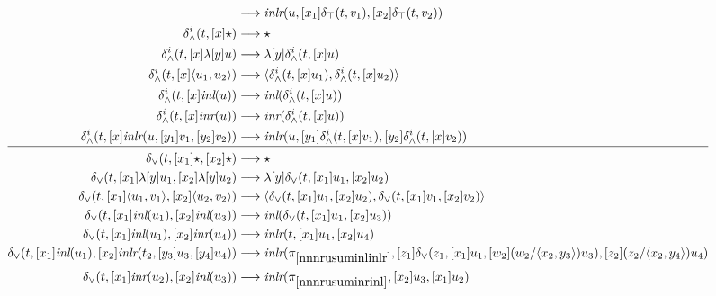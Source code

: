 \documentclass[screen, sigconf,authorversion,nonacm]{acmart}
\theoremstyle{acmdefinition}
\numberwithin{equation}{section}
\newcommand\abstr[1]{[#1]}
\newcommand\inl{\mbox{\it inl}}
\newcommand\inr{\mbox{\it inr}}
\newcommand\inlr{\mbox{\it inlr}}
\newcommand\elimtop{\delta_{\top}}
\newcommand\elimand{\delta_{\wedge}}
\newcommand\elimor{\delta_{\vee}}
\newcommand\pair[2]{\langle #1, #2 \rangle}
\newcommand\lra{\longrightarrow}
\begin{document}
\begin{figure*}[!ht]
\begin{align}
    &\lra \inlr(u,\abstr{x_1} \elimtop(t,v_1),
    \abstr{x_2} \elimtop(t,v_2))
    \label{nnnruleelimtopinlr} \\
    \elimand^i(t,\abstr{x}\star) &\lra \star\label{nnnruleelimandstar}\\
    \elimand^i(t,\abstr{x} \lambda \abstr{y} u) &\lra \lambda \abstr{y} \elimand^i(t,\abstr{x} u)\label{nnnruleelimandlambda}\\
    \elimand^i(t,\abstr{x} \pair{u_1}{u_2}) &\lra\pair{\elimand^i(t,\abstr{x} u_1)}{\elimand^i(t,\abstr{x}u_2)}\\
    \elimand^i(t,\abstr{x} \inl(u)) &\lra \inl(\elimand^i(t,\abstr{x}u))\\
    \elimand^i(t,\abstr{x} \inr(u)) &\lra \inr(\elimand^i(t,\abstr{x}u))\\
    \elimand^i(t,\abstr{x} \inlr(u,\abstr{y_1} v_1,\abstr{y_2} v_2))
    &\lra
    \inlr(u, \abstr{y_1} \elimand^i(t,\abstr{x}v_1),
  \abstr{y_2} \elimand^i(t,\abstr{x}v_2))
\label{nnnruleelimandinlr}\\[1pt]\hline\nonumber\\[-11pt]
    \elimor(t,\abstr{x_1} \star, \abstr{x_2} \star) &\lra \star
    \label{nnnruleelimorstar}\\
    \elimor(t,\abstr{x_1} \lambda \abstr{y} u_1,
    \abstr{x_2} \lambda \abstr{y} u_2) &\lra
    \lambda \abstr{y} 
    \elimor(t,\abstr{x_1} u_1, \abstr{x_2} u_2)\\
    \elimor(t,\abstr{x_1} \pair{u_1}{v_1}, \abstr{x_2} \pair{u_2}{v_2})
    &\lra
    \pair{\elimor(t,\abstr{x_1} u_1, \abstr{x_2} u_2)}
    {\elimor(t,\abstr{x_1} v_1, \abstr{x_2} v_2)}
    \label{nnnruleelimorpair}
    \\
    \elimor(t,\abstr{x_1} \inl(u_1), \abstr{x_2} \inl(u_3)) &\lra \inl (\elimor(t, \abstr{x_1} u_1, \abstr{x_2} u_3)) \label{nnnrusuminlinl} 
    \\
    \elimor(t,\abstr{x_1} \inl(u_1), \abstr{x_2} \inr(u_4)) &\lra \inlr (t, \abstr{x_1} u_1, \abstr{x_2} u_4)\label{nnnrusuminlinr}
    \\
    \elimor(t,\abstr{x_1} \inl(u_1), \abstr{x_2} \inlr(t_2, \abstr{y_3}u_3,\abstr{y_4} u_4)) &\lra \inlr(\pi_{\ref{nnnrusuminlinlr}}, \abstr{z_1}\elimor(z_1, \abstr{x_1} u_1, \abstr{w_2} (w_2/\pair{x_2}{y_3})u_3), \abstr{z_2} (z_2/\pair{x_2}{y_4})u_4) \label{nnnrusuminlinlr}
    \\
    \elimor(t,\abstr{x_1} \inr(u_2), \abstr{x_2} \inl(u_3)) &\lra \inlr (\pi_{\ref{nnnrusuminrinl}}, \abstr{x_2} u_3, \abstr{x_1} u_2)\label{nnnrusuminrinl}
    \\

\end{align}
\end{figure*}
\end{document}
